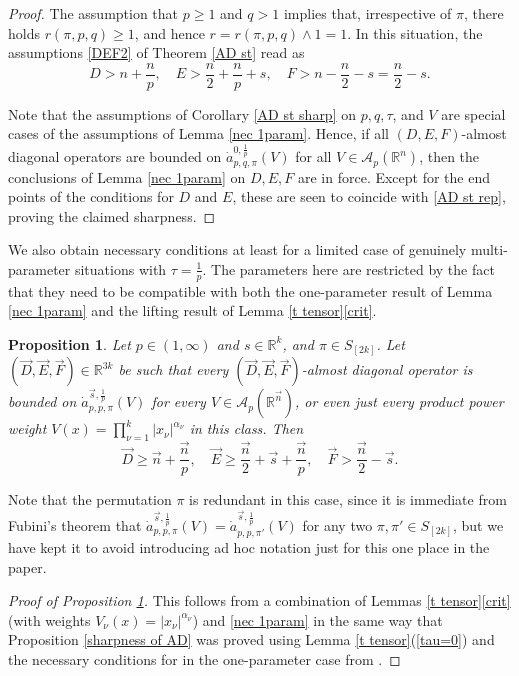 \documentclass[11pt, reqno]{amsart}
\newtheorem{proposition}[theorem]{Proposition}
\theoremstyle{definition}
\theoremstyle{remark}
\numberwithin{equation}{section}
\newcommand{\A}{\mathscr A}
\newcommand{\vD}{\vec D}
\newcommand{\vE}{\vec E}
\newcommand{\vF}{\vec F}
\newcommand{\R}{\mathbb R}
\newcommand{\vn}{\vec n}
\newcommand{\vs}{\vec s}
\newcommand{\abs}[1]{|#1|}
\begin{document}
\begin{proof}
The assumption that $p\geq 1$ and $q>1$ implies that, irrespective of $\pi$, there holds $r(\pi,p,q)\geq 1$, and hence $r=r(\pi,p,q)\wedge 1=1$.
In this situation, the assumptions \eqref{DEF2} of Theorem \ref{AD st} read as
\begin{equation}\label{AD st rep}
D>n+\frac{n}{p},\quad
E>\frac{n}{2}+\frac{n}{p}+s,\quad
F>n-\frac{n}{2}-s=\frac{n}{2}-s.
\end{equation}

Note that the assumptions of Corollary \ref{AD st sharp} on $p,q,\tau$, and $V$ are special cases of the assumptions of Lemma \ref{nec 1param}. Hence, if  all $(D,E,F)$-almost diagonal operators are bounded on $\dot a^{0,\frac1p}_{p,q,\pi}(V)$ for all $V\in\A_p(\R^n)$, then the conclusions of Lemma \ref{nec 1param} on $D,E,F$ are in force. Except for the end points of the conditions for $D$ and $E$, these are seen to coincide with \eqref{AD st rep}, proving the claimed sharpness.
\end{proof}

We also obtain necessary conditions at least for a limited case of genuinely multi-parameter situations with $\tau=\frac1p$. The parameters here are restricted by the fact that they need to be compatible with both the one-parameter result of Lemma \ref{nec 1param} and the lifting result of Lemma \ref{t tensor}\eqref{crit}.

\begin{proposition}\label{nec crit}
Let $p\in(1,\infty)$ and $s\in\R^k$, and $\pi\in S_{[2k]}$. Let $(\vD,\vE,\vF)\in\R^{3k}$ be such that every $(\vD,\vE,\vF)$-almost diagonal operator is bounded on $\dot a^{\vs,\frac{1}{p}}_{p,p,\pi}(V)$ for every $V\in\A_p(\R^{\vn})$, or even just every product power weight $V(x)=\prod_{\nu=1}^k\abs{x_\nu}^{\alpha_\nu}$ in this class.
Then
\begin{equation*}
\vD\geq \vn+\frac{\vn}{p},\quad \vE\geq\frac{\vn}{2}+\vs+\frac{\vn}{p},\quad \vF>\frac{\vn}{2}-\vs.
\end{equation*}
\end{proposition}

Note that the permutation $\pi$ is redundant in this case, since it is immediate from Fubini's theorem that $\dot a^{\vs,\frac{1}{p}}_{p,p,\pi}(V)=\dot a^{\vs,\frac{1}{p}}_{p,p,\pi'}(V)$ for any two $\pi,\pi'\in S_{[2k]}$, but we have kept it to avoid introducing ad hoc notation just for this one place in the paper.

\begin{proof}[Proof of Proposition \ref{nec crit}]
This follows from a combination of Lemmas \ref{t tensor}\eqref{crit} (with weights $V_\nu(x)=\abs{x_\nu}^{\alpha_\nu}$) and \ref{nec 1param} in the same way that Proposition \ref{sharpness of AD} was proved using Lemma \ref{t tensor}(\ref{tau=0}) and the necessary conditions for in the one-parameter case from \cite{BHYY:1b}.
\end{proof}
\end{document}
